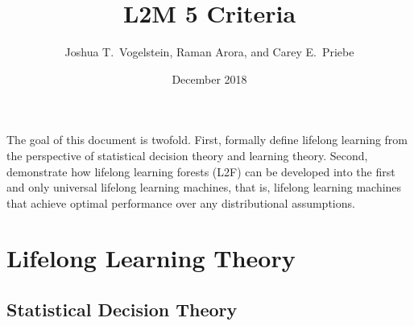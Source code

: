 \documentclass{article}
\title{L2M 5 Criteria}
\author{Joshua T.~Vogelstein, Raman Arora, and Carey E.~Priebe}
\affil{Johns Hopkins University}
\date{December 2018}
\begin{document}
\maketitle

The goal of this document is twofold. First, formally define lifelong learning from the perspective of statistical decision theory and learning theory.  Second, demonstrate how lifelong learning forests (L2F) can be developed into the first and only universal lifelong learning machines, that is, lifelong learning machines that achieve optimal performance over any distributional assumptions.  

\tableofcontents

\clearpage
\setcounter{section}{-1}
\section{Lifelong Learning Theory}
\subsection{Statistical Decision Theory}
\end{document}
